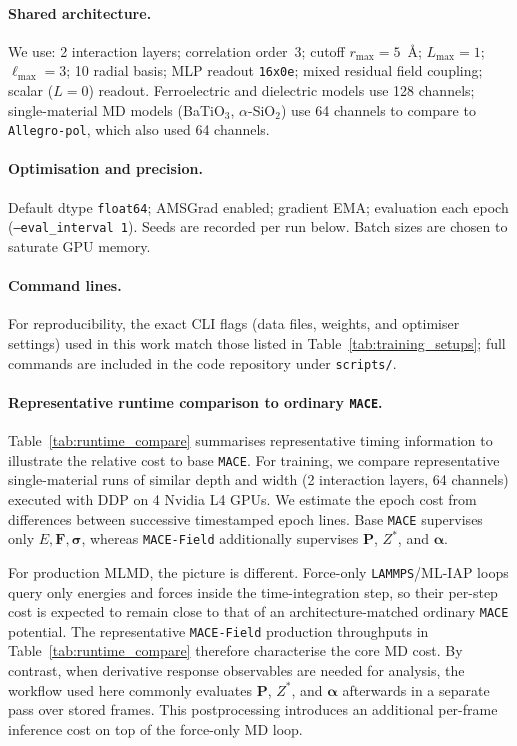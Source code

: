 \documentclass[aps,physrev,graphicx,amsmath,amssymb,reprint]{revtex4-2} %
\begin{document}
\paragraph*{Shared architecture.} We use: 2 interaction layers; correlation order~3; cutoff $r_\text{max}=5$~\AA; $L_{\max}=1$; $\ell_{\max}=3$; 10 radial basis; MLP readout \texttt{16x0e}; mixed residual field coupling; scalar ($L{=}0$) readout. Ferroelectric and dielectric models use 128 channels; single-material MD models (BaTiO$_3$, $\alpha$-SiO$_2$) use 64 channels to compare to \texttt{Allegro-pol}, which also used 64 channels.
\\

\paragraph*{Optimisation and precision.}
Default dtype \texttt{float64}; AMSGrad enabled; gradient EMA; evaluation each epoch
(\texttt{--eval\_interval 1}). Seeds are recorded per run below. Batch sizes are chosen to saturate GPU memory.
\\

\paragraph*{Command lines.}
For reproducibility, the exact CLI flags (data files, weights, and optimiser settings) used in this work match those listed in
Table~\ref{tab:training_setups}; full commands are included in the code repository under \texttt{scripts/}.
\\

\paragraph*{Representative runtime comparison to ordinary \texttt{MACE}.}
Table~\ref{tab:runtime_compare} summarises representative timing information to illustrate the relative cost to base \texttt{MACE}. For training, we compare representative single-material runs of similar depth and width (2 interaction layers, 64 channels) executed with DDP on 4 Nvidia L4 GPUs. We estimate the epoch cost from differences between successive timestamped epoch lines. Base \texttt{MACE} supervises only $E,\mathbf F,\boldsymbol\sigma$, whereas \texttt{MACE-Field} additionally supervises $\mathbf P$, $Z^*$, and $\boldsymbol\alpha$.

For production MLMD, the picture is different. Force-only \texttt{LAMMPS}/ML-IAP loops query only energies and forces inside the time-integration step, so their per-step cost is expected to remain close to that of an architecture-matched ordinary \texttt{MACE} potential. The representative \texttt{MACE-Field} production throughputs in Table~\ref{tab:runtime_compare} therefore characterise the core MD cost. By contrast, when derivative response observables are needed for analysis, the workflow used here commonly evaluates $\mathbf P$, $Z^*$, and $\boldsymbol\alpha$ afterwards in a separate pass over stored frames. This postprocessing introduces an additional per-frame inference cost on top of the force-only MD loop.
\end{document}
